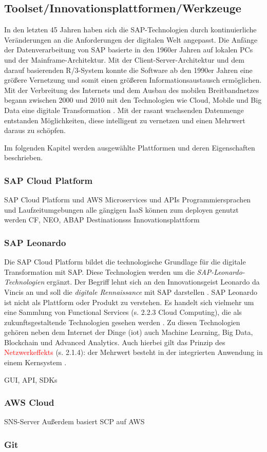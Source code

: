 \subsection{Toolset/Innovationsplattformen/Werkzeuge}
In den letzten 45 Jahren haben sich die SAP-Technologien durch kontinuierliche Veränderungen an die Anforderungen der digitalen Welt angepasst. Die Anfänge der Datenverarbeitung von SAP basierte in den 1960er Jahren auf lokalen PCs und der Mainframe-Architektur. Mit der Client-Server-Architektur und dem darauf basierenden R/3-System konnte die Software ab den 1990er Jahren eine größere Vernetzung und somit einen größeren Informationsaustausch ermöglichen. Mit der Verbreitung des Internets und dem Ausbau des mobilen Breitbandnetzes begann zwischen 2000 und 2010 mit den Technologien wie Cloud, Mobile und Big Data eine digitale Transformation \citep[S. 44]{Elsner2018}. Mit der rasant wachsenden Datenmenge entstanden Möglichkeiten, diese intelligent zu vernetzen und einen Mehrwert daraus zu schöpfen.

Im folgenden Kapitel werden ausgewählte Plattformen und deren Eigenschaften beschrieben.

\subsubsection{SAP Cloud Platform}


SAP Cloud Platform und AWS Microservices und APIs
Programmiersprachen und Laufzeitumgebungen
alle gängigen IaaS können zum deployen genutzt werden
CF, NEO, ABAP
Destinationsss
Innovationsplattform
\subsubsection{SAP Leonardo}

Die SAP Cloud Platform bildet die technologische Grundlage für die digitale Transformation mit SAP. Diese
Technologien werden um die \textit{SAP-Leonardo-Technologien} ergänzt. Der Begriff lehnt sich an den Innovationsgeist Leonardo da Vincis an und soll die \textit{digitale Rennaissance} mit SAP  darstellen \citep{Howells2017}.
SAP Leonardo ist nicht als Plattform oder Produkt zu verstehen. Es handelt sich vielmehr um eine Sammlung von Functional Services (s. 2.2.3 Cloud Computing), die als zukunftsgestaltende Technologien gesehen werden \citep{Elsner2018}. Zu diesen Technologien
gehören neben dem Internet der Dinge (\acf{iot}) auch Machine Learning, Big Data, Blockchain und Advanced Analytics.
Auch hierbei gilt das Prinzip des \textcolor{red}{Netzwerkeffekts} (s. 2.1.4): der Mehrwert besteht in der integrierten Anwendung in einem Kernsystem \citep{Elsner2018}.

GUI, API, SDKs

\subsubsection{AWS Cloud}
SNS-Server
Außerdem basiert SCP auf AWS

\subsubsection{Git}

\newpage
